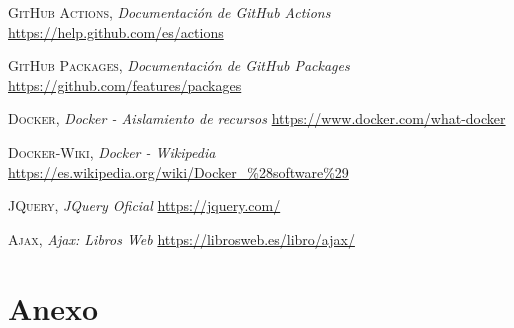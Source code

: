 \documentclass[a4paper,11pt]{book}
\begin{document}
\begin{thebibliography}{}
 \textsc{GitHub Actions},
\textit{Documentación de GitHub Actions }
\url{https://help.github.com/es/actions}


 \textsc{GitHub Packages},
\textit{Documentación de GitHub Packages }
\url{https://github.com/features/packages}

 \textsc{Docker},
\textit{Docker - Aislamiento de recursos}
\url{https://www.docker.com/what-docker} 

 \textsc{Docker-Wiki},
\textit{Docker - Wikipedia}
\url{https://es.wikipedia.org/wiki/Docker_\%28software\%29} 


 \textsc{JQuery},
\textit{JQuery Oficial}
\url{https://jquery.com/}


 \textsc{Ajax},
\textit{Ajax: Libros Web}
\url{https://librosweb.es/libro/ajax/}


\end{thebibliography}

\chapter{ Anexo}



%
%
%
%

%
%

\thispagestyle{empty}
\end{document}
